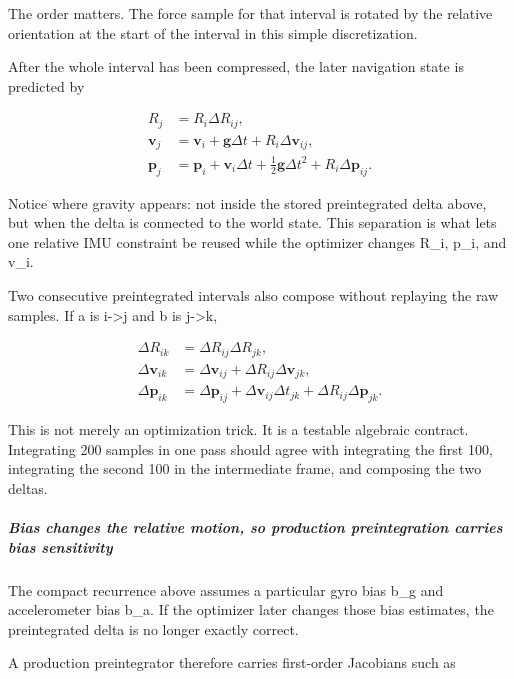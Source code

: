 The order matters. The force sample for that interval is rotated by the relative orientation at the start of the interval in this simple discretization.

After the whole interval has been compressed, the later navigation state is predicted by

\[
\begin{aligned}
R_j &= R_i\Delta R_{ij},\\
\mathbf v_j &= \mathbf v_i+\mathbf g\Delta t+R_i\Delta\mathbf v_{ij},\\
\mathbf p_j &= \mathbf p_i+\mathbf v_i\Delta t+\tfrac12\mathbf g\Delta t^2+R_i\Delta\mathbf p_{ij}.
\end{aligned}
\]

Notice where gravity appears: not inside the stored preintegrated delta above, but when the delta is connected to the world state. This separation is what lets one relative IMU constraint be reused while the optimizer changes R\_i, p\_i, and v\_i.

Two consecutive preintegrated intervals also compose without replaying the raw samples. If a is i-\textgreater j and b is j-\textgreater k,

\[
\begin{aligned}
\Delta R_{ik}&=\Delta R_{ij}\Delta R_{jk},\\
\Delta\mathbf v_{ik}&=\Delta\mathbf v_{ij}+\Delta R_{ij}\Delta\mathbf v_{jk},\\
\Delta\mathbf p_{ik}&=\Delta\mathbf p_{ij}+\Delta\mathbf v_{ij}\Delta t_{jk}+\Delta R_{ij}\Delta\mathbf p_{jk}.
\end{aligned}
\]

This is not merely an optimization trick. It is a testable algebraic contract. Integrating 200 samples in one pass should agree with integrating the first 100, integrating the second 100 in the intermediate frame, and composing the two deltas.

\subparagraph{Bias changes the relative motion, so production preintegration carries bias sensitivity}\label{04-visual-computing-ii-ch035-bias-changes-the-relative-motion-so-production-preintegration-carries-bias-sensitivity}

The compact recurrence above assumes a particular gyro bias b\_g and accelerometer bias b\_a. If the optimizer later changes those bias estimates, the preintegrated delta is no longer exactly correct.

A production preintegrator therefore carries first-order Jacobians such as

